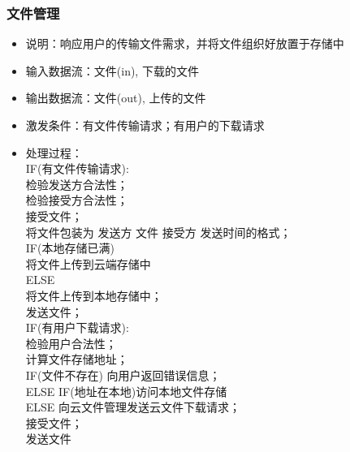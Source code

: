             \subsubsection{文件管理}
            \begin{itemize}
                \item 说明：响应用户的传输文件需求，并将文件组织好放置于存储中
                \item 输入数据流：文件(in), 下载的文件
                \item 输出数据流：文件(out), 上传的文件
                \item 激发条件：有文件传输请求；有用户的下载请求
                \item 处理过程：\\
                      IF(有文件传输请求):\\
                        检验发送方合法性；\\
                        检验接受方合法性；\\
                        接受文件；\\
                        将文件包装为 发送方 文件 接受方 发送时间的格式；\\
                      IF(本地存储已满) \\
                        将文件上传到云端存储中\\
                      ELSE \\
                        将文件上传到本地存储中；\\
                        发送文件；\\
                
                      IF(有用户下载请求):\\
                        检验用户合法性；\\
                        计算文件存储地址；\\
                        IF(文件不存在) 向用户返回错误信息；\\
                        ELSE IF(地址在本地)访问本地文件存储\\
                        ELSE 向云文件管理发送云文件下载请求；\\
                      接受文件；\\
                      发送文件\\
            \end{itemize}    
